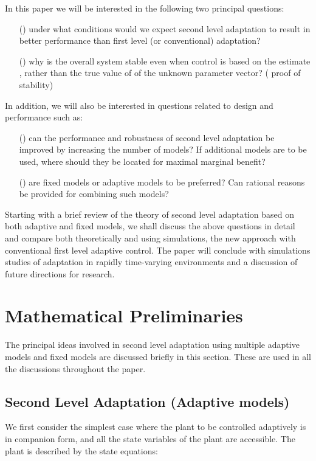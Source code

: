\documentclass[conference]{IEEEtran}
\begin{document}
In this paper we will be interested in the following two principal questions:
\begin{enumerate}
\item[(\expandafter{\romannumeral1})] under what conditions would we expect second level adaptation to result in better performance than first level (or conventional) adaptation?
\item[(\expandafter{\romannumeral2})] why is the overall system stable even when control is based on the estimate , rather than the true value of   of the unknown parameter vector? ( proof of stability)
\end{enumerate}

In addition, we will also be interested in questions related to design and performance such as:
\begin{enumerate}
\item[(\expandafter{\romannumeral3})] can the performance and robustness of second level adaptation be improved by increasing the number of models? If additional models are to be used, where should they be located for maximal marginal benefit?
\item[(\expandafter{\romannumeral4})] are fixed models or adaptive models to be preferred? Can rational reasons be provided for combining such models?
\end{enumerate}


Starting with a brief review of the theory of second level adaptation based on both adaptive and fixed models, we shall discuss the above questions in detail and  compare both theoretically and using simulations, the new approach with conventional first level adaptive control. The paper will conclude with simulations studies of adaptation in rapidly time-varying environments and a discussion of future directions for research.



\section{Mathematical Preliminaries}
The principal ideas involved in second level adaptation using multiple adaptive models and fixed models are discussed briefly in this section. These are used in all the discussions throughout the paper.

\subsection{Second Level Adaptation (Adaptive models)}
We first consider the simplest case where the plant to be controlled adaptively is in companion form, and all the state variables of the plant are accessible. The plant is described by the state equations:
\end{document}
